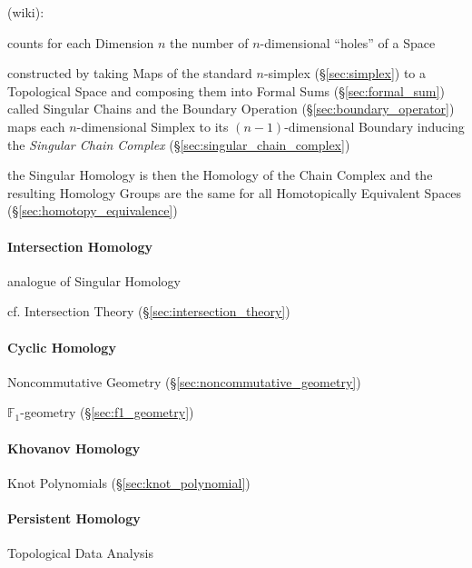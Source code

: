(wiki):

counts for each Dimension $n$ the number of $n$-dimensional ``holes'' of a
Space

constructed by taking Maps of the standard $n$-simplex (\S\ref{sec:simplex}) to
a Topological Space and composing them into Formal Sums
(\S\ref{sec:formal_sum}) called Singular Chains and the Boundary Operation
(\S\ref{sec:boundary_operator}) maps each $n$-dimensional Simplex to its
$(n-1)$-dimensional Boundary inducing the \emph{Singular Chain Complex}
(\S\ref{sec:singular_chain_complex})

the Singular Homology is then the Homology of the Chain Complex and the
resulting Homology Groups are the same for all Homotopically Equivalent Spaces
(\S\ref{sec:homotopy_equivalence})



\paragraph{Intersection Homology}\label{sec:intersection_homology}\hfill

analogue of Singular Homology

\fist cf. Intersection Theory (\S\ref{sec:intersection_theory})



\paragraph{Cyclic Homology}\label{sec:cyclic_homology}\hfill

Noncommutative Geometry (\S\ref{sec:noncommutative_geometry})

$\mathbb{F}_1$-geometry (\S\ref{sec:f1_geometry})



\paragraph{Khovanov Homology}\label{sec:khovanov_homology}\hfill

\fist Knot Polynomials (\S\ref{sec:knot_polynomial})



\paragraph{Persistent Homology}\label{sec:persistent_homology}\hfill

Topological Data Analysis



